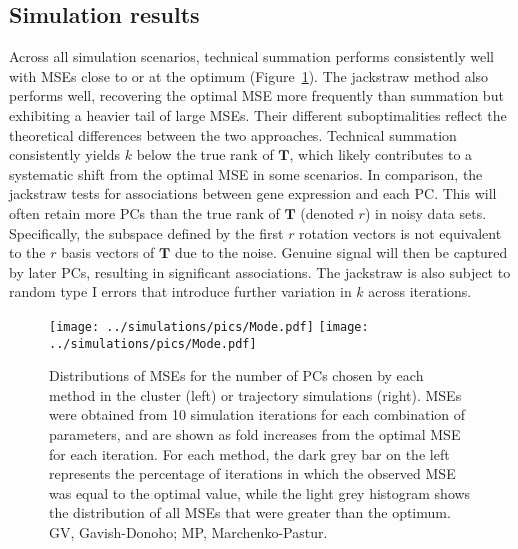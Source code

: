 \documentclass[10pt,letterpaper]{article}
\begin{document}
\subsection{Simulation results}
Across all simulation scenarios, technical summation performs consistently well with MSEs close to or at the optimum (Figure~\ref{fig:all}). 
The jackstraw method also performs well, recovering the optimal MSE more frequently than summation but exhibiting a heavier tail of large MSEs.
Their different suboptimalities reflect the theoretical differences between the two approaches.
Technical summation consistently yields $k$ below the true rank of $\mathbf{T}$, which likely contributes to a systematic shift from the optimal MSE in some scenarios.
In comparison, the jackstraw tests for associations between gene expression and each PC.
This will often retain more PCs than the true rank of $\mathbf{T}$ (denoted $r$) in noisy data sets.
Specifically, the subspace defined by the first $r$ rotation vectors is not equivalent to the $r$ basis vectors of $\mathbf{T}$ due to the noise.
Genuine signal will then be captured by later PCs, resulting in significant associations.
The jackstraw is also subject to random type I errors that introduce further variation in $k$ across iterations.

\begin{figure}
\begin{center}
    \texttt{[image: ../simulations/pics/Mode.pdf]}
    \texttt{[image: ../simulations/pics/Mode.pdf]}
\end{center}
\caption{Distributions of MSEs for the number of PCs chosen by each method in the cluster (left) or trajectory simulations (right).
MSEs were obtained from 10 simulation iterations for each combination of parameters, and are shown as fold increases from the optimal MSE for each iteration.
For each method, the dark grey bar on the left represents the percentage of iterations in which the observed MSE was equal to the optimal value,
while the light grey histogram shows the distribution of all MSEs that were greater than the optimum.
GV, Gavish-Donoho; MP, Marchenko-Pastur.}
\label{fig:all}
\end{figure}
\end{document}
